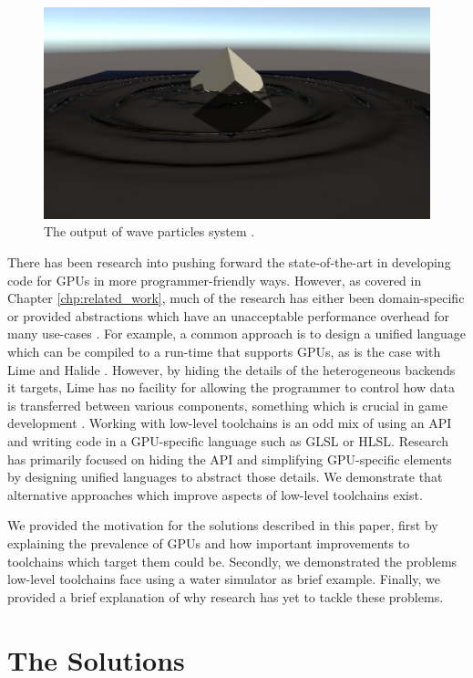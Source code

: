 \documentclass[a4paper,12pt,twoside,openright]{report}
\begin{document}
\begin{figure}[h]
\centering
\includegraphics[width=0.8\linewidth]{waveparticles_example}
\caption{The output of wave particles system \cite{WaveParticlesGPU}.}
\label{fig:waveparticles_example}
\end{figure}

There has been research into pushing forward the state-of-the-art in developing
code for GPUs in more programmer-friendly ways. However, as covered in Chapter
\ref{chp:related_work}, much of the research has either been domain-specific or
provided abstractions which have an unacceptable performance overhead for many
use-cases \cite{CAMPFail1}. For example, a common approach is to design a
unified language which can be compiled to a run-time that supports GPUs, as is
the case with Lime and Halide \cite{Lime2010} \cite{Halide}. However, by hiding
the details of the heterogeneous backends it targets, Lime has no facility for
allowing the programmer to control how data is transferred between various
components, something which is crucial in game development \cite{LowLevelGPU}.
Working with low-level toolchains is an odd mix of using an API and writing
code in a GPU-specific language such as GLSL or HLSL. Research has primarily
focused on hiding the API and simplifying GPU-specific elements by designing
unified languages to abstract those details. We demonstrate that alternative
approaches which improve aspects of low-level toolchains exist.

We provided the motivation for the solutions described in this paper, first by
explaining the prevalence of GPUs and how important improvements to toolchains
which target them could be. Secondly, we demonstrated the problems low-level
toolchains face using a water simulator as brief example. Finally, we provided
a brief explanation of why research has yet to tackle these problems.

\section{The Solutions}
\end{document}
